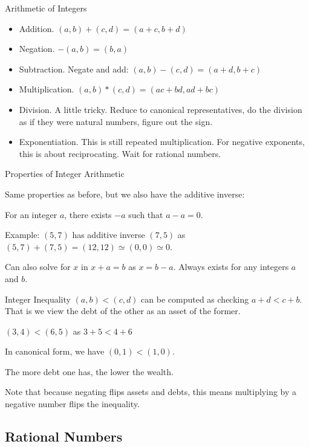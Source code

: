 \documentclass{beamer}
\begin{document}
\begin{frame}{Arithmetic of Integers}

\begin{itemize}
\item Addition.  $(a,b) + (c,d) = (a+c, b+d)$
\item Negation. $-(a,b) = (b, a)$
\item Subtraction. Negate and add:  $(a,b) - (c,d) = (a+d, b+c)$
\item Multiplication.  $(a,b)*(c,d) = (ac + bd, ad + bc)$
\item Division. A little tricky. Reduce to canonical representatives, do the division as if they were natural numbers, figure out the sign. 
\item Exponentiation. This is still repeated multiplication. For negative exponents, this is about reciprocating. Wait for rational numbers. 
\end{itemize} 

\end{frame}

\begin{frame}{Properties of Integer Arithmetic}

Same properties as before, but we also have the additive inverse: 

For an integer $a$, there exists $-a$ such that $a-a = 0$.

Example: $(5,7)$ has additive inverse $(7,5)$ as $(5,7)+(7,5) = (12, 12) \simeq (0,0) \simeq 0$.

Can also solve for $x$ in $x + a = b$ as $x = b-a$. Always exists for any integers $a$ and $b$.

\end{frame}

\begin{frame}{Integer Inequality}
    $(a,b) < (c,d)$ can be computed as checking $a + d < c + b$. That is we view the debt of the other as an asset of the former. 

    $(3,4) < (6,5)$ as $3+5 < 4 +6$

    In canonical form, we have $(0, 1) < (1, 0)$. 

    The more debt one has, the lower the wealth. 

    Note that because negating flips assets and debts, this means multiplying by a negative number flips the inequality. 
    
\end{frame}

\subsection{Rational Numbers}
\end{document}
